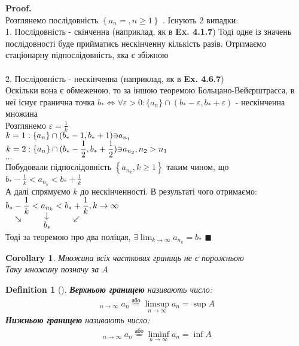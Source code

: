 \documentclass[a4paper, 14pt]{extarticle}
\DeclareMathOperator*\uplim{\overline{lim}}
\DeclareMathOperator*\downlim{\underline{lim}}
\def\huge{\displaystyle}
\newcommand{\sequence}[2][{}]{%
\ifthenelse{\equal{#1}{}}{$\{{#2}, n \geq 1 \}$}
{$\huge \left\{ {#2} = {#1}, n \geq 1 \right\}$}%
}
\theoremstyle{theoremdd}
\theoremstyle{theoremdd}
\newtheorem{definition}[theorem]{Definition}
\theoremstyle{theoremdd}
\theoremstyle{theoremdd}
\theoremstyle{theoremdd}
\theoremstyle{theoremdd}
\theoremstyle{theoremdd}
\theoremstyle{theoremdd}
\newtheorem{corollary}[theorem]{Corollary}
\newenvironment{pf}{\vspace*{-3mm} \textbf{Proof. \\}}{$\blacksquare$}
\def\subsequence#1{$\displaystyle \left\{ {#1}, k\geq1 \right\}$}
\begin{document}
	\begin{pf}
	Розглянемо послідовність \sequence{a_n}. Існують 2 випадки:\\
	1. Послідовність - скінченна (наприклад, як в {\textbf{Ex. 4.1.7}}) Тоді одне із значень послідовності буде прийматись нескінченну кількість разів. Отримаємо стаціонарну підпослідовність, яка є збіжною\\
	\\
	2. Послідовність - нескінченна (наприклад, як в {\textbf{Ex. 4.6.7}})\\
	Оскільки вона є обмеженою, то за іншою теоремою Больцано-Вейєрштрасса, в неї існує гранична точка $b_* \iff \forall \varepsilon > 0:\{a_n\}\cap (b_*-\varepsilon, b_*+\varepsilon)$ - нескінченна множина\\
	Розглянемо $\varepsilon = \displaystyle \frac{1}{k}$\\
	$\displaystyle k = 1: \{a_n\}\cap(b_*-1, b_*+1) \rotatebox[origin=c]{180}{$\in$}a_{n_1}$\\
	$\displaystyle k = 2: \{a_n\}\cap(b_*-\frac{1}{2}, b_*+\frac{1}{2}) \rotatebox[origin=c]{180}{$\in$}a_{n_2}, n_2>n_1$\\
	$\cdots$\\
	Побудовали підпослідовність \subsequence{a_{n_k}} таким чином, що\\ $\displaystyle b_*-\frac{1}{k} < a_{n_k} < b_*+\frac{1}{k}$\\
	А далі спрямуємо $k$ до нескінченності. В результаті чого отримаємо:\\
	$\displaystyle \underset{\rotatebox[origin=c]{-45}{$\rightarrow$}}{b_*-\frac{1}{k}} < \underset{\underset{\displaystyle b_*}{\rotatebox[origin=c]{90}{$\leftarrow$}}}{a_{n_k}} < \underset{\rotatebox[origin=c]{45}{$\leftarrow$}}{b_*+\frac{1}{k}}, k \to \infty$\\
	Тоді за теоремою про два поліцая, $\displaystyle \exists \lim_{k \to \infty} a_{n_k} = b_*$
	\end{pf}
	
	\begin{corollary}
	Множина всіх часткових границь не є порожньою\\
	Таку множину позначу за $A$
	\end{corollary}
	
	\begin{definition}[\vspace{0.1cm}]
	\textbf{Верхньою границею} називають число:
	\begin{align*}
	\displaystyle \uplim_{n \to \infty} a_n \overset{\textrm{або}}{=} \limsup_{n \to \infty} a_n = \sup A
	\end{align*}
	\textbf{Нижньою границею} називають число:
	\begin{align*}
	\displaystyle \downlim_{n \to \infty} a_n \overset{\textrm{або}}{=} \liminf_{n \to \infty} a_n = \inf A
	\end{align*}
	\end{definition}
	
\end{document}
